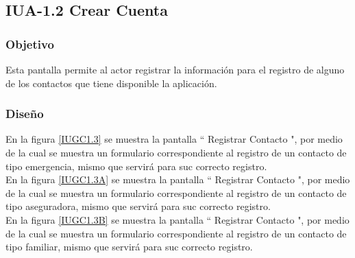 \subsection{IUA-1.2 Crear Cuenta}

\subsubsection{Objetivo}

	
 Esta pantalla permite al actor registrar la información para el registro de alguno de los contactos que tiene disponible la aplicación.

\subsubsection{Diseño}


    En la figura \ref{IUGC1.3} se muestra la pantalla `` Registrar Contacto ", por medio de la cual se muestra un formulario correspondiente al registro de un contacto de tipo emergencia, mismo que servirá para suc correcto registro.\\

    En la figura \ref{IUGC1.3A} se muestra la pantalla `` Registrar Contacto ", por medio de la cual se muestra un formulario correspondiente al registro de un contacto de tipo aseguradora, mismo que servirá para suc correcto registro.\\

    En la figura \ref{IUGC1.3B} se muestra la pantalla `` Registrar Contacto ", por medio de la cual se muestra un formulario correspondiente al registro de un contacto de tipo familiar, mismo que servirá para suc correcto registro.\\
    

